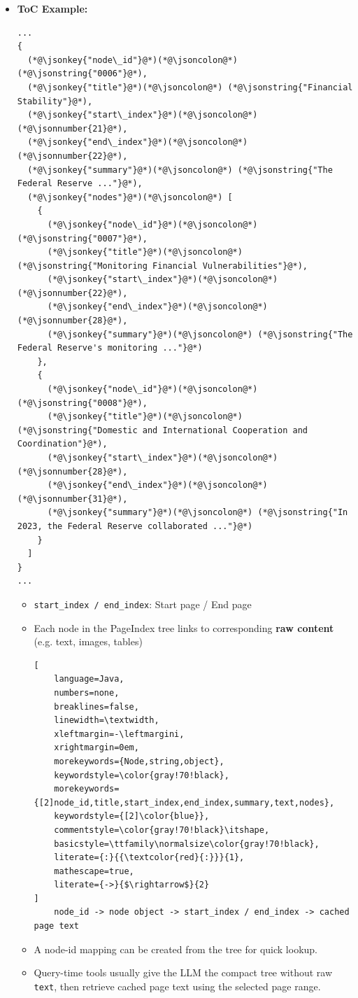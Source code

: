 \documentclass[11pt,a4paper]{article}
\newcommand{\fieldname}[1]{\textcolor{red!70!black}{\texttt{#1}}}
\newcommand{\notesquare}{\textcolor{gray!70!black}{\rule{0.45em}{0.45em}}}
\newcommand{\jsonkey}[1]{\textcolor{blue!70!black}{\texttt{#1}}}
\newcommand{\jsonstring}[1]{\textcolor{green!45!black}{\texttt{#1}}}
\newcommand{\jsonnumber}[1]{\textcolor{orange!85!black}{\texttt{#1}}}
\begin{document}
\begin{itemize}
    \item \textbf{\large ToC Example:}
    \begin{lstlisting}[style=pageindexjson,basicstyle=\ttfamily\normalsize\color{gray!80!black}]
...
{
  (*@\jsonkey{"node\_id"}@*)(*@\jsoncolon@*) (*@\jsonstring{"0006"}@*),
  (*@\jsonkey{"title"}@*)(*@\jsoncolon@*) (*@\jsonstring{"Financial Stability"}@*),
  (*@\jsonkey{"start\_index"}@*)(*@\jsoncolon@*) (*@\jsonnumber{21}@*),
  (*@\jsonkey{"end\_index"}@*)(*@\jsoncolon@*) (*@\jsonnumber{22}@*),
  (*@\jsonkey{"summary"}@*)(*@\jsoncolon@*) (*@\jsonstring{"The Federal Reserve ..."}@*),
  (*@\jsonkey{"nodes"}@*)(*@\jsoncolon@*) [
    {
      (*@\jsonkey{"node\_id"}@*)(*@\jsoncolon@*) (*@\jsonstring{"0007"}@*),
      (*@\jsonkey{"title"}@*)(*@\jsoncolon@*) (*@\jsonstring{"Monitoring Financial Vulnerabilities"}@*),
      (*@\jsonkey{"start\_index"}@*)(*@\jsoncolon@*) (*@\jsonnumber{22}@*),
      (*@\jsonkey{"end\_index"}@*)(*@\jsoncolon@*) (*@\jsonnumber{28}@*),
      (*@\jsonkey{"summary"}@*)(*@\jsoncolon@*) (*@\jsonstring{"The Federal Reserve's monitoring ..."}@*)
    },
    {
      (*@\jsonkey{"node\_id"}@*)(*@\jsoncolon@*) (*@\jsonstring{"0008"}@*),
      (*@\jsonkey{"title"}@*)(*@\jsoncolon@*) (*@\jsonstring{"Domestic and International Cooperation and Coordination"}@*),
      (*@\jsonkey{"start\_index"}@*)(*@\jsoncolon@*) (*@\jsonnumber{28}@*),
      (*@\jsonkey{"end\_index"}@*)(*@\jsoncolon@*) (*@\jsonnumber{31}@*),
      (*@\jsonkey{"summary"}@*)(*@\jsoncolon@*) (*@\jsonstring{"In 2023, the Federal Reserve collaborated ..."}@*)
    }
  ]
}
...
\end{lstlisting}
\begin{itemize}[label=\notesquare]
    \item \fieldname{start\_index / end\_index}: Start page / End page
    \item Each node in the PageIndex tree links to corresponding \textbf{raw content} (e.g. text, images, tables)
    \begin{lstlisting}[
    language=Java,
    numbers=none,
    breaklines=false,
    linewidth=\textwidth,
    xleftmargin=-\leftmargini,
    xrightmargin=0em,
    morekeywords={Node,string,object},
    keywordstyle=\color{gray!70!black},
    morekeywords={[2]node_id,title,start_index,end_index,summary,text,nodes},
    keywordstyle={[2]\color{blue}},
    commentstyle=\color{gray!70!black}\itshape,
    basicstyle=\ttfamily\normalsize\color{gray!70!black},
    literate={:}{{\textcolor{red}{:}}}{1},
    mathescape=true,                    
    literate={->}{$\rightarrow$}{2}     
]
    node_id -> node object -> start_index / end_index -> cached page text
\end{lstlisting} 
\end{itemize}
    \begin{itemize} 
        \item A node-id mapping can be created from the tree for quick lookup.
        \item Query-time tools usually give the LLM the compact tree without raw \fieldname{text}, then retrieve cached page text using the selected page range.
    \end{itemize}
\end{itemize}
\end{document}
